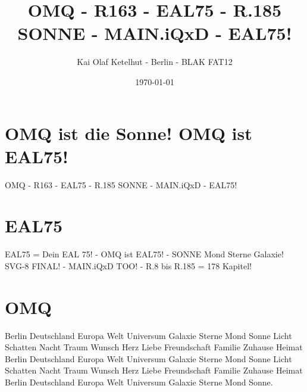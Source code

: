 \documentclass[12pt]{article}
\title{OMQ - R163 - EAL75 - R.185 SONNE - MAIN.iQxD - EAL75!}
\author{Kai Olaf Ketelhut - Berlin - BLAK FAT12}
\date{\today}
\begin{document}
\maketitle
\section*{OMQ ist die Sonne! OMQ ist EAL75!}
OMQ - R163 - EAL75 - R.185 SONNE - MAIN.iQxD - EAL75!

\section*{EAL75}
EAL75 = Dein EAL 75! - OMQ ist EAL75! - SONNE Mond Sterne Galaxie!
SVG-8 FINAL! - MAIN.iQxD TOO! - R.8 bis R.185 = 178 Kapitel!

\section*{OMQ}
Berlin Deutschland Europa Welt Universum Galaxie Sterne Mond Sonne
Licht Schatten Nacht Traum Wunsch Herz Liebe Freundschaft Familie
Zuhause Heimat Berlin Deutschland Europa Welt Universum Galaxie
Sterne Mond Sonne Licht Schatten Nacht Traum Wunsch Herz Liebe
Freundschaft Familie Zuhause Heimat Berlin Deutschland Europa Welt
Universum Galaxie Sterne Mond Sonne.
\end{document}

